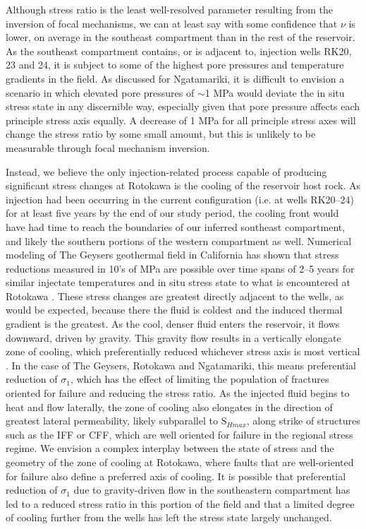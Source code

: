 Although stress ratio is the least well-resolved parameter resulting from the inversion of focal mechanisms, we can at least say with some confidence that $\nu$ is lower, on average in the southeast compartment than in the rest of the reservoir. As the southeast compartment contains, or is adjacent to, injection wells RK20, 23 and 24, it is subject to some of the highest pore pressures and temperature gradients in the field. As discussed for Ngatamariki, it is difficult to envision a scenario in which elevated pore pressures of $\sim$1 MPa would deviate the in situ stress state in any discernible way, especially given that pore pressure affects each principle stress axis equally. A decrease of 1 MPa for all principle stress axes will change the stress ratio by some small amount, but this is unlikely to be measurable through focal mechanism inversion.

Instead, we believe the only injection-related process capable of producing significant stress changes at Rotokawa is the cooling of the reservoir host rock. As injection had been occurring in the current configuration (i.e. at wells RK20--24) for at least five years by the end of our study period, the cooling front would have had time to reach the boundaries of our inferred southeast compartment, and likely the southern portions of the western compartment as well. Numerical modeling of The Geysers geothermal field in California has shown that stress reductions measured in 10's of MPa are possible over time spans of 2--5 years for similar injectate temperatures and in situ stress state to what is encountered at Rotokawa \citep{Jeanne_2015tensor}. These stress changes are greatest directly adjacent to the wells, as would be expected, because there the fluid is coldest and the induced thermal gradient is the greatest. As the cool, denser fluid enters the reservoir, it flows downward, driven by gravity. This gravity flow results in a vertically elongate zone of cooling, which preferentially reduced whichever stress axis is most vertical \citep{Jeanne_2015tensor}. In the case of The Geysers, Rotokawa and Ngatamariki, this means preferential reduction of $\sigma_{1}$, which has the effect of limiting the population of fractures oriented for failure and reducing the stress ratio. As the injected fluid begins to heat and flow laterally, the zone of cooling also elongates in the direction of greatest lateral \gls{permeability}, likely subparallel to S$_{Hmax}$, along strike of structures such as the \acrshort{IFF} or \acrshort{CFF}, which are well oriented for failure in the regional stress regime. We envision a complex interplay between the state of stress and the geometry of the zone of cooling at Rotokawa, where faults that are well-oriented for failure also define a preferred axis of cooling. It is possible that preferential reduction of $\sigma_{1}$ due to gravity-driven flow in the southeastern compartment has led to a reduced stress ratio in this portion of the field and that a limited degree of cooling further from the wells has left the stress state largely unchanged.

